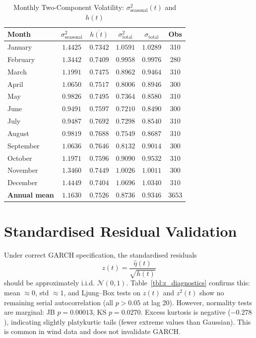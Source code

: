 \documentclass[11pt, a4paper, twoside]{article}
\begin{document}
\begin{table}[ht]
\centering
\caption{Monthly Two-Component Volatility: $\sigma^2_{\text{seasonal}}(t)$ and $h(t)$}
\label{tbl:two_comp_vol}
\small
\begin{tabularx}{\textwidth}{l|cccc|c}
\toprule
\textbf{Month} & $\sigma^2_{\text{seasonal}}$ & $\overline{h(t)}$ & $\sigma^2_{\text{total}}$ & $\sigma_{\text{total}}$ & \textbf{Obs} \\
\midrule
January & $1.4425$ & $0.7342$ & $1.0591$ & $1.0289$ & 310 \\
February & $1.3442$ & $0.7409$ & $0.9958$ & $0.9976$ & 280 \\
March & $1.1991$ & $0.7475$ & $0.8962$ & $0.9464$ & 310 \\
April & $1.0650$ & $0.7517$ & $0.8006$ & $0.8946$ & 300 \\
May & $0.9826$ & $0.7495$ & $0.7364$ & $0.8580$ & 310 \\
June & $0.9491$ & $0.7597$ & $0.7210$ & $0.8490$ & 300 \\
July & $0.9487$ & $0.7692$ & $0.7298$ & $0.8540$ & 310 \\
August & $0.9819$ & $0.7688$ & $0.7549$ & $0.8687$ & 310 \\
September & $1.0636$ & $0.7646$ & $0.8132$ & $0.9014$ & 300 \\
October & $1.1971$ & $0.7596$ & $0.9090$ & $0.9532$ & 310 \\
November & $1.3460$ & $0.7449$ & $1.0026$ & $1.0011$ & 300 \\
December & $1.4449$ & $0.7404$ & $1.0696$ & $1.0340$ & 310 \\
\midrule
\textbf{Annual mean} & $1.1630$ & $0.7526$ & $0.8736$ & $0.9346$ & $3653$ \\
\bottomrule
\end{tabularx}
\end{table}

\section{Standardised Residual Validation}

Under correct GARCH specification, the standardised residuals
\begin{equation}
z(t) = \frac{\hat{\eta}(t)}{\sqrt{h(t)}}
\end{equation}
should be approximately i.i.d. $\mathcal{N}(0, 1)$. Table~\ref{tbl:z_diagnostics} confirms this: mean $\approx 0$, std $\approx 1$, and Ljung--Box tests on $z(t)$ and $z^2(t)$ show no remaining serial autocorrelation (all $p > 0.05$ at lag 20). However, normality tests are marginal: JB $p = 0.00013$, KS $p = 0.0270$. Excess kurtosis is negative ($-0.278$), indicating slightly platykurtic tails (fewer extreme values than Gaussian). This is common in wind data and does not invalidate GARCH.
\end{document}
